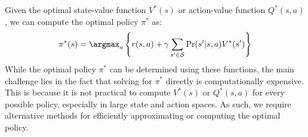 Given the optimal state-value function $V^\ast(s)$ or action-value function $Q^\ast(s,a)$, we can compute the optimal policy $\pi^\ast$ as: 
\[\pi^\ast(s)=\argmax_a\left\{r(s,a)+\gamma\sum_{s^\prime\in\mathcal{S}}\Pr(s^\prime|s,a)V^\ast(s^\prime)\right\}\]
While the optimal policy $\pi^\ast$ can be determined using these functions, the main challenge lies in the fact that solving for $\pi^\ast$ directly is computationally expensive. 
This is because it is not practical to compute $V^\ast(s)$ or $Q^\ast (s,a)$ for every possible policy, especially in large state and action spaces.
As such, we require alternative methods for efficiently approximating or computing the optimal policy.